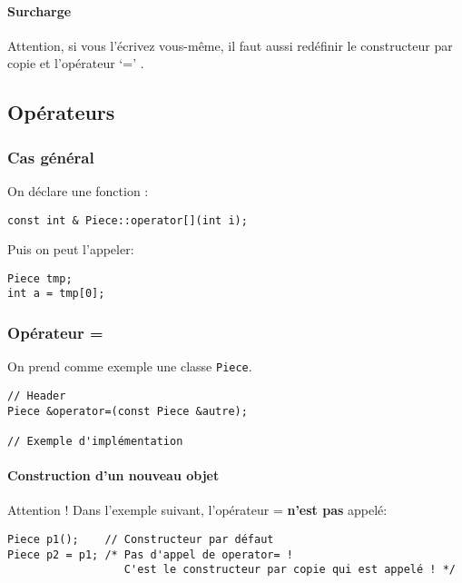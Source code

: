 \documentclass[10pt,a4paper,french]{article}
\begin{document}
\paragraph{Surcharge}
Attention, si vous l'écrivez vous-même, il faut aussi redéfinir le constructeur par copie  et l'opérateur `=' .

\subsection{Opérateurs}\label{operators}

\subsubsection{Cas général}

On déclare une fonction :

\begin{verbatim}
const int & Piece::operator[](int i);
\end{verbatim}

Puis on peut l'appeler:

\begin{verbatim}
Piece tmp;
int a = tmp[0];
\end{verbatim}

\subsubsection{Opérateur =}\label{operator-equals}

On prend comme exemple une classe {\tt Piece}.

\begin{verbatim}
// Header
Piece &operator=(const Piece &autre);

// Exemple d'implémentation

\end{verbatim}

\paragraph{Construction d'un nouveau objet}

Attention ! Dans l'exemple suivant, l'opérateur = \textbf{n'est pas} appelé:
\begin{verbatim}
Piece p1();    // Constructeur par défaut
Piece p2 = p1; /* Pas d'appel de operator= !
                  C'est le constructeur par copie qui est appelé ! */
\end{verbatim}
\end{document}

